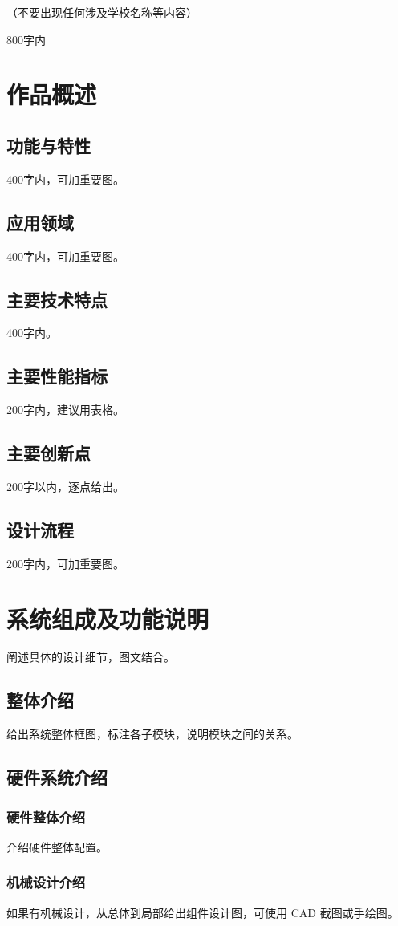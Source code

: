 \documentclass[UTF8,fontset=fandol,zihao=-4]{ctexart}
\newcommand{\slot}[1]{\par{\color{black!55}#1}\par\vspace{6pt}}
\begin{document}
\begin{center}（不要出现任何涉及学校名称等内容）\end{center}
\abstractheading
\slot{800字内}
\section{作品概述}
\subsection{功能与特性}\slot{400字内，可加重要图。}
\subsection{应用领域}\slot{400字内，可加重要图。}
\subsection{主要技术特点}\slot{400字内。}
\subsection{主要性能指标}\slot{200字内，建议用表格。}
\subsection{主要创新点}\slot{200字以内，逐点给出。}
\subsection{设计流程}\slot{200字内，可加重要图。}
\section{系统组成及功能说明}
\slot{阐述具体的设计细节，图文结合。}
\subsection{整体介绍}\slot{给出系统整体框图，标注各子模块，说明模块之间的关系。}
\subsection{硬件系统介绍}
\subsubsection{硬件整体介绍}\slot{介绍硬件整体配置。}
\subsubsection{机械设计介绍}\slot{如果有机械设计，从总体到局部给出组件设计图，可使用 CAD 截图或手绘图。}
\end{document}
